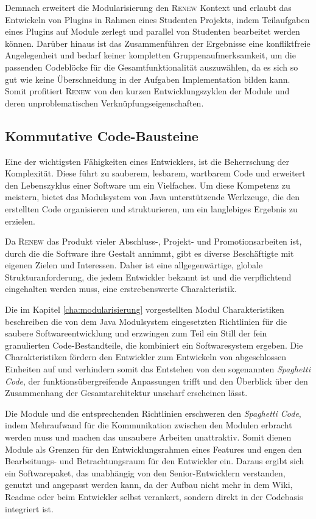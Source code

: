 		Demnach erweitert die Modularisierung den \textsc{Renew} Kontext und erlaubt das Entwickeln von Plugins in Rahmen eines Studenten Projekts, indem Teilaufgaben eines Plugins auf Module zerlegt und parallel von Studenten bearbeitet werden können. Darüber hinaus ist das Zusammenführen der Ergebnisse eine konfliktfreie Angelegenheit und bedarf keiner kompletten Gruppenaufmerksamkeit, um die passenden Codeblöcke für die Gesamtfunktionalität auszuwählen, da es sich so gut wie keine Überschneidung in der Aufgaben Implementation bilden kann. Somit profitiert \textsc{Renew} von den kurzen Entwicklungszyklen der Module und deren unproblematischen Verknüpfungseigenschaften. 

	\subsection{Kommutative Code-Bausteine}\label{sub:cbs}
		Eine der wichtigsten Fähigkeiten eines Entwicklers, ist die Beherrschung der Komplexität. Diese führt zu sauberem, lesbarem, wartbarem Code und erweitert den Lebenszyklus einer Software um ein Vielfaches. Um diese Kompetenz zu meistern, bietet das Modulsystem von Java unterstützende Werkzeuge, die den erstellten Code organisieren und strukturieren, um ein langlebiges Ergebnis zu erzielen.\bigbreak

		Da \textsc{Renew} das Produkt vieler Abschluss-, Projekt- und Promotionsarbeiten ist, durch die die Software ihre Gestalt annimmt, gibt es diverse Beschäftigte mit eigenen Zielen und Interessen. Daher ist eine allgegenwärtige, globale Strukturanforderung, die jedem Entwickler bekannt ist und die verpflichtend eingehalten werden muss, eine erstrebenswerte Charakteristik.\bigbreak

		Die im Kapitel \ref{cha:modularisierung} vorgestellten Modul Charakteristiken beschreiben die von dem Java Modulsystem eingesetzten Richtlinien für die saubere Softwareentwicklung und erzwingen zum Teil ein Still der fein granulierten Code-Bestandteile, die kombiniert ein Softwaresystem ergeben.\newline
		Die Charakteristiken fördern den Entwickler zum Entwickeln von abgeschlossen Einheiten auf und verhindern somit das Entstehen von den sogenannten \textit{Spaghetti Code}, der funktionsübergreifende Anpassungen trifft und den Überblick über den Zusammenhang der Gesamtarchitektur unscharf erscheinen lässt. \bigbreak

		Die Module und die entsprechenden Richtlinien erschweren den \textit{Spaghetti Code}, indem Mehraufwand für die Kommunikation zwischen den Modulen erbracht werden muss und machen das unsaubere Arbeiten unattraktiv. Somit dienen Module als Grenzen für den Entwicklungsrahmen eines Features und engen den Bearbeitungs- und Betrachtungsraum für den Entwickler ein. Daraus ergibt sich ein Softwarepaket, das unabhängig von den Senior-Entwicklern verstanden, genutzt und angepasst werden kann, da der Aufbau nicht mehr in dem Wiki, Readme oder beim Entwickler selbst verankert, sondern direkt in der Codebasis integriert ist.\bigbreak

